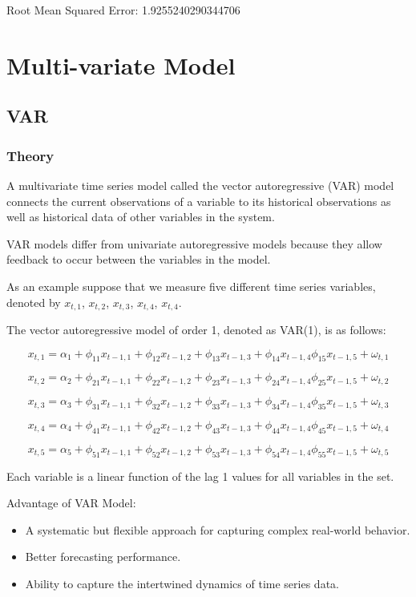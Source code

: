 Root Mean Squared Error:  1.9255240290344706




\section{Multi-variate Model}
\subsection{VAR}
\subsubsection{Theory}
A multivariate time series model called the vector autoregressive (VAR) model connects the current observations of a variable to its historical observations as well as historical data of other variables in the system.

VAR models differ from univariate autoregressive models because they allow feedback to occur between the variables in the model. 

As an example suppose that we measure five different time series variables, denoted by $x_{t,1}$, $x_{t,2}$, $x_{t,3}$, $x_{t,4}$, $x_{t,4}$.

The vector autoregressive model of order 1, denoted as VAR(1), is as follows:

$$ x_{t,1} = \alpha_1 + \phi_{11}x_{t-1,1} + \phi_{12}x_{t-1,2} + \phi_{13}x_{t-1,3} + \phi_{14}x_{t-1,4} \phi_{15}x_{t-1,5} + \omega_{t,1}$$

$$ x_{t,2} = \alpha_2 + \phi_{21}x_{t-1,1} + \phi_{22}x_{t-1,2} + \phi_{23}x_{t-1,3} + \phi_{24}x_{t-1,4} \phi_{25}x_{t-1,5} + \omega_{t,2}$$

$$ x_{t,3} = \alpha_3 + \phi_{31}x_{t-1,1} + \phi_{32}x_{t-1,2} + \phi_{33}x_{t-1,3} + \phi_{34}x_{t-1,4} \phi_{35}x_{t-1,5} + \omega_{t,3}$$

$$ x_{t,4} = \alpha_4 + \phi_{41}x_{t-1,1} + \phi_{42}x_{t-1,2} + \phi_{43}x_{t-1,3} + \phi_{44}x_{t-1,4} \phi_{45}x_{t-1,5} + \omega_{t,4}$$

$$ x_{t,5} = \alpha_5 + \phi_{51}x_{t-1,1} + \phi_{52}x_{t-1,2} + \phi_{53}x_{t-1,3} + \phi_{54}x_{t-1,4} \phi_{55}x_{t-1,5} + \omega_{t,5}$$


Each variable is a linear function of the lag 1 values for all variables in the set.
\vspace{10mm}

Advantage of VAR Model:
\begin{itemize}
    \item A systematic but flexible approach for capturing complex real-world behavior.
\item Better forecasting performance.
\item	Ability to capture the intertwined dynamics of time series data.
\end{itemize}

